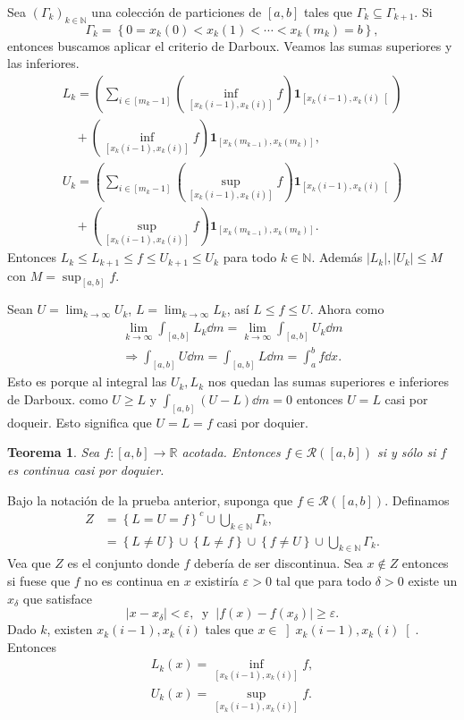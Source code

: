 \documentclass[12pt]{article}
\theoremstyle{plain}
\newtheorem{Th}{Teorema}[subsection]   %
\theoremstyle{definition}
\theoremstyle{remark}
\numberwithin{equation}{section}
\newcommand{\bN}{\mathbb{N}}        %
\newcommand{\bR}{\mathbb{R}}        %
\newcommand{\cR}{\mathcal{R}}       %
\newcommand{\ind}{\mathbf{1}}       %
\renewcommand{\geq}{\geqslant}      %
\renewcommand{\leq}{\leqslant}      %
\renewcommand{\:}{\colon}           %
\newcommand{\conj}[1]{\left\lbrace#1\right\rbrace}
\newcommand{\bonj}[1]{\left\lbrack#1\right\rbrack}
\newcommand{\obonj}[1]{\left\rbrack#1\right\lbrack}
\newcommand{\lbonj}[1]{\left\lbrack#1\right\lbrack}
\begin{document}
\begin{multicols}{2}
\begin{ptcbp}
Sea $(\Gamma_k)_{k\in\bN}$ una colección de particiones de $\bonj{a,b}$ tales que $\Gamma_k\subseteq\Gamma_{k+1}$. Si
$$\Gamma_k=\conj{0=x_k(0)<x_k(1)<\cdots<x_k(m_k)=b},$$
entonces buscamos aplicar el criterio de Darboux. Veamos las sumas superiores y las inferiores.
\begin{gather*}
  L_k=\left(\sum_{i\in\bonj{m_k-1}}(\inf_{\bonj{x_k(i-1),x_k(i)}}f)\ind_{\lbonj{x_k(i-1),x_k(i)}}\right)\\
  \quad+(\inf_{\bonj{x_k(i-1),x_k(i)}}f)\ind_{\bonj{x_k(m_{k-1}),x_k(m_k)}},\\
  U_k=\left(\sum_{i\in\bonj{m_k-1}}(\sup_{\bonj{x_k(i-1),x_k(i)}}f)\ind_{\lbonj{x_k(i-1),x_k(i)}}\right)\\
  \quad+(\sup_{\bonj{x_k(i-1),x_k(i)}}f)\ind_{\bonj{x_k(m_{k-1}),x_k(m_k)}}.
\end{gather*}
Entonces $L_k\leq L_{k+1}\leq f\leq U_{k+1}\leq U_k$ para todo $k\in \bN$. Además $|L_k|,|U_k|\leq M$ con $M=\sup_{\bonj{a,b}}f$.\par
Sean $U=\lim_{k\to\infty}U_k$, $L=\lim_{k\to\infty}L_k$, así $L\leq f\leq U$. Ahora como
\begin{gather*}
  \lim_{k\to\infty}\int_{\bonj{a,b}} L_k\dd m=\lim_{k\to\infty}\int_{\bonj{a,b}} U_k\dd m\\
  \Rightarrow \int_{\bonj{a,b}}U\dd m=\int_{\bonj{a,b}}L\dd m=\int_{a}^{b}f\dd x.
\end{gather*}
Esto es porque al integral las $U_k, L_k$ nos quedan las sumas superiores e inferiores de Darboux. como $U\geq L$ y $\int_{\bonj{a,b}}(U-L)\dd m=0$ entonces $U=L$ casi por doqueir. Esto significa que $U=L=f$ casi por doquier.
\end{ptcbp}

\begin{Th}
  Sea $f\: \bonj{a,b}\to\bR$ acotada. Entonces $f\in\cR(\bonj{a,b})$ si y sólo si $f$ es continua casi por doquier.
\end{Th}

\begin{ptcbp}
Bajo la notación de la prueba anterior, suponga que $f\in\cR(\bonj{a,b})$. Definamos
\begin{align*}
  Z &=\conj{L=U=f}^c\cup\bigcup_{k\in\bN}\Gamma_k,\\
  &=\conj{L\neq U}\cup\conj{L\neq f}\cup\conj{f\neq U}\cup\bigcup_{k\in\bN}\Gamma_k.
\end{align*}
Vea que $Z$ es el conjunto donde $f$ debería de ser discontinua. Sea $x\not\in Z$ entonces si fuese que $f$ no es continua en $x$ existiría $\varepsilon>0$ tal que para todo $\delta>0$ existe un $x_\delta$ que satisface
$$|x-x_\delta|<\varepsilon,\ \text{ y }\ |f(x)-f(x_\delta)|\geq \varepsilon.$$
Dado $k$, existen $x_k(i-1),x_k(i)$ tales que $x\in\obonj{x_k(i-1),x_k(i)}$. Entonces
\begin{gather*}
  L_k(x)=\inf_{\bonj{x_k(i-1),x_k(i)}}f,\\
  U_k(x)=\sup_{\bonj{x_k(i-1),x_k(i)}}f.
\end{gather*}


\end{ptcbp}
\end{multicols}
\end{document}
